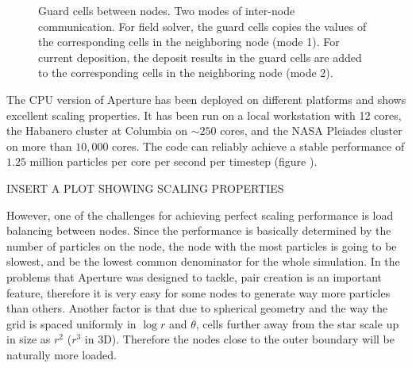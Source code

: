 \begin{figure}[h]
  \centering
  \caption[Guard cells between nodes.]{Guard cells between nodes. Two modes of
    inter-node communication. For field solver, the guard cells copies the values
  of the corresponding cells in the neighboring node (mode 1). For current
  deposition, the deposit results in the guard cells are added to the
  corresponding cells in the neighboring node (mode 2).}
  \label{fig:guard-cells}
\end{figure}

The CPU version of Aperture has been deployed on different platforms and shows
excellent scaling properties. It has been run on a local workstation with 12
cores, the Habanero cluster at Columbia on $\sim 250$ cores, and the NASA
Pleiades cluster on more than $10,000$ cores. The code can reliably achieve a
stable performance of $1.25$ million particles per core per second per timestep
(figure ).

INSERT A PLOT SHOWING SCALING PROPERTIES



However, one of the challenges for achieving perfect scaling performance is load
balancing between nodes. Since the performance is basically determined by the
number of particles on the node, the node with the most particles is going to be
slowest, and be the lowest common denominator for the whole simulation. In the
problems that Aperture was designed to tackle, pair creation is an important
feature, therefore it is very easy for some nodes to generate way more particles
than others. Another factor is that due to spherical geometry and the way the
grid is spaced uniformly in $\log r$ and $\theta$, cells further away from the
star scale up in size as $r^{2}$ ($r^{3}$ in 3D). Therefore the nodes close to
the outer boundary will be naturally more loaded.

